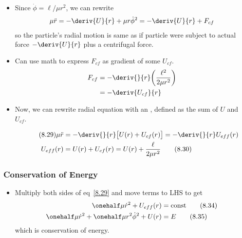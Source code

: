 \documentclass[10pt, twocolumn]{article}
\DeclareRobustCommand{\mybox}[2][gray!20]{%
	\begin{tcolorbox}[   %
		breakable,
		left=0pt,
		right=0pt,
		top=-13pt,
		bottom=0pt,
		colback=#1,
		colframe=#1,
		width=0.45\dimexpr\textwidth\relax,
		enlarge left by=0mm,
		boxsep=1pt,
		arc=0pt,outer arc=0pt,
		]
		#2
	\end{tcolorbox}
}
\newcommand\tlab[1]{\tag{#1}\label{#1}}
\begin{document}
\subsection{}
\begin{itemize}
	\item Since $\dot{\phi} = \ell/\mu r^2$, we can rewrite
	\begin{align}
		\mu\ddot{r} = -\deriv{U}{r} + \mu r \dot{\phi}^2 = -\deriv{U}{r} + F_{cf}
	\end{align}
	so the particle's radial motion is same as if particle were subject to actual force $-\deriv{U}{r}$ plus a centrifugal force. 
	\item Can use math to express $F_{cf}$ as gradient of some $U_{cf}$. 
	\begin{align}
		F_{cf} &= -\deriv{}{r} \bigg(\frac{\ell^2}{2\mu r^2}\bigg) \\
		&= -\deriv{U_{cf}}{r}
	\end{align}
	\item Now, we can rewrite radial equation with an , defined as the sum of $U$ and $U_{cf}$. \mybox[gray!20]{
		\begin{align} \tag{8.29}
			\mu \ddot{r} &= - \deriv{}{r} \big[ U(r) + U_{cf}(r) \big] = - \deriv{}{r}U_{eff}(r) \label{8.29} \\
			U_{eff}(r) &= U(r) + U_{cf}(r) = U(r) + \frac{\ell}{2\mu r^2} \label{8.30}\tag{8.30}
		\end{align}}
\end{itemize}

\subsubsection{Conservation of Energy}
\begin{itemize}
	\item Multiply both sides of eq~\ref{8.29} and move terms to LHS to get
	\begin{align}
		\onehalf \mu \dot{r}^2 + U_{eff}(r) &= \text{const} 				\tlab{8.34} \\
		\onehalf \mu \dot{r}^2  + \onehalf \mu r^2 \dot{\phi}^2 + U(r) &= E \tlab{8.35}
	\end{align}
	which is conservation of energy. 
\end{itemize}
%
% 
\end{document}
